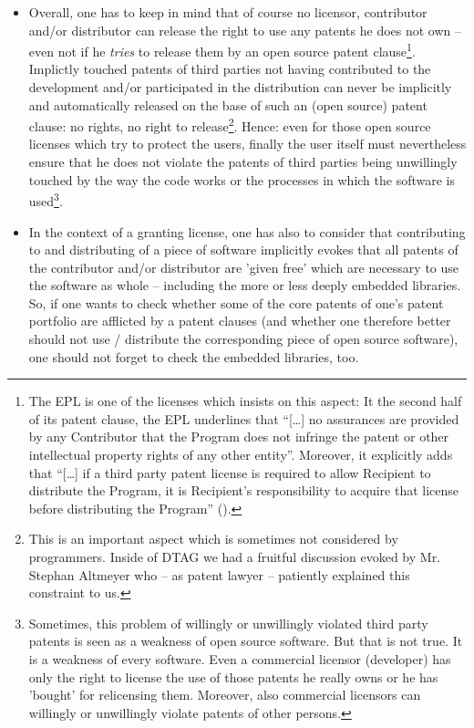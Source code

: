 \begin{itemize}
  
  \item Overall, one has to keep in mind that of course no licensor, contributor
  and/or distributor can release the right to use any patents he does not own --
  even not if he \emph{tries} to release them by an open source patent
  clause\footnote{The EPL is one of the licenses which insists on this aspect:
  It the second half of its patent clause, the EPL underlines that
  \enquote{[\ldots] no assurances are provided by any Contributor that the
  Program does not infringe the patent or other intellectual property rights of
  any other entity}. Moreover, it explicitly adds that \enquote{[\ldots] if a
  third party patent license is required to allow Recipient to distribute the
  Program, it is Recipient's responsibility to acquire that license before
  distributing the Program} (\cite[cf.][\nopage wp
  §2c]{Epl10OsiLicense2005a}).}. Implictly touched patents of third parties not
  having contributed to the development and/or participated in the distribution
  can never be implicitly and automatically released on the base of such an
  (open source) patent clause: no rights, no right to release\footnote{This is
  an important aspect which is sometimes not considered by programmers. Inside
  of DTAG we had a fruitful discussion evoked by Mr. Stephan Altmeyer who -- as
  patent lawyer -- patiently explained this constraint to us.}. Hence: even for
  those open source licenses which try to protect the users, finally the user
  itself must nevertheless ensure that he does not violate the patents of third
  parties being unwillingly touched by the way the code works or the processes
  in which the software is used\footnote{Sometimes, this problem of willingly or
  unwillingly violated third party patents is seen as a weakness of open source
  software. But that is not true. It is a weakness of every software. Even a
  commercial licensor (developer) has only the right to license the use of those
  patents he really owns or he has 'bought' for relicensing them. Moreover, also
  commercial licensors can willingly or unwillingly violate patents of other
  persons.}.
  
  \item In the context of a granting license, one has also to consider that
  contributing to and distributing of a piece of software implicitly evokes that
  all patents of the contributor and/or distributor are 'given free' which are
  necessary to use the software as whole -- including the more or less deeply
  embedded libraries. So, if one wants to check whether some of the core patents
  of one's patent portfolio are afflicted by a patent clauses (and whether one
  therefore better should not use / distribute the corresponding piece of open
  source software), one should not forget to check the embedded libraries, too.
  

\end{itemize}
